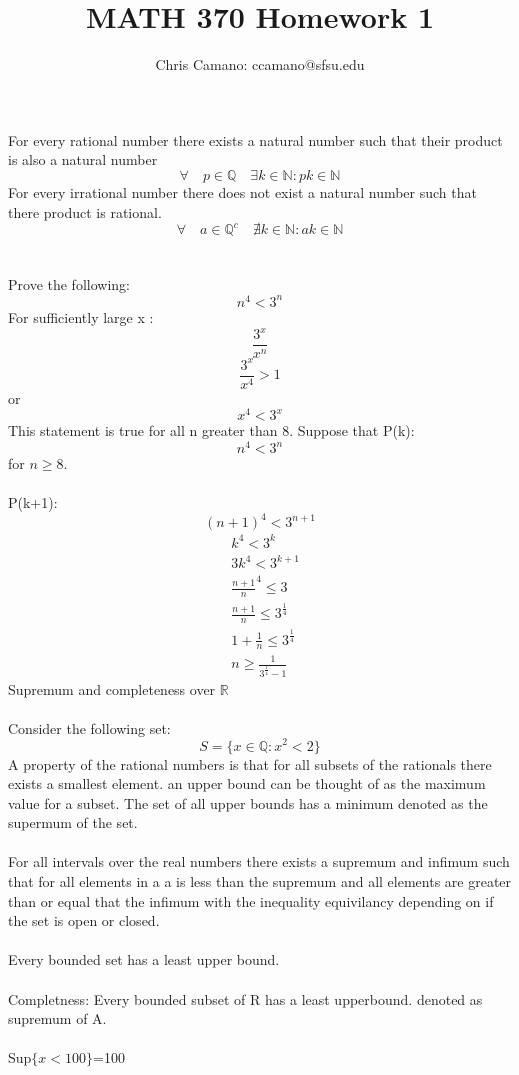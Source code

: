 \documentclass[12pt]{article}
\author{Chris Camano: ccamano@sfsu.edu}
\title{MATH 370  Homework 1 }
\date
\newcommand{\Q}{\mathbb{Q}}
\newcommand{\N}{\mathbb{N}}
\theoremstyle{definition}
\theoremstyle{remark}
\numberwithin{equation}{section}
\begin{document}
\maketitle
For every rational number there exists a natural number such that their product is also a natural number
\[
  \forall\quad  p\in \Q \quad \exists  k \in \N : pk\in \N
\]
For every irrational number there does not exist a natural number such that there product is rational.
\[
  \forall\quad  a \in \mathbb{Q}^c \quad \nexists k\in \N: ak\in \N
\]\\\\
Prove the following:
\[
  n^4< 3^n
\]
For sufficiently large x :
\[
  \frac{3^x}{x^n}
\]
\[
  \frac{3^x}{x^4}>1
\]
or
\[
  x^4<3^x
\]
This statement is true for all n greater than 8.
Suppose that
P(k):
\[
  n^4<3^n
\]
for $n\geq 8$.\\\\
P(k+1):
\[
  (n+1)^4<3^{n+1}
\]
\begin{align*}
  &k^4<3^k\\
  &3k^4<3^{k+1}\\
  &\frac{n+1}{n}^4\leq 3\\
  &\frac{n+1}{n}\leq 3^{\frac{1}{4}}\\
  &1+\frac{1}{n}\leq 3^{\frac{1}{4}}\\
  &n\geq \frac{1}{3^{\frac{1}{4}}-1}
\end{align*}
 Supremum and completeness over $\mathbb{R}$\\\\
Consider the following set:
\[
S=\{x\in \Q: x^2<2\}
\]
A property of the rational numbers is that for all subsets of the rationals there exists a smallest element. an upper bound can be thought of as the maximum value for a subset. The set of all upper bounds has a minimum denoted as the supermum of the set. \\\\
For all intervals over the real numbers there exists a supremum and infimum such that for all elements in a a is less than the supremum and all elements are greater than or equal that the infimum with the inequality equivilancy depending on if the set is open or closed. \\\\
Every bounded set has a least upper bound. \\\\
 Completness: Every bounded subset of R has a least upperbound. denoted as supremum of A. \\\\
Sup$\{x<100\}$=100
\end{document}
